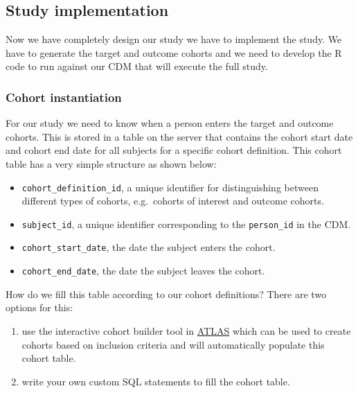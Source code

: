\documentclass[
]{article}
\providecommand{\tightlist}{%
  \setlength{\itemsep}{0pt}\setlength{\parskip}{0pt}}
\begin{document}
\hypertarget{study-implementation}{%
\subsection{Study implementation}\label{study-implementation}}

Now we have completely design our study we have to implement the study.
We have to generate the target and outcome cohorts and we need to
develop the R code to run against our CDM that will execute the full
study.

\hypertarget{cohort-instantiation}{%
\subsubsection{Cohort instantiation}\label{cohort-instantiation}}

For our study we need to know when a person enters the target and
outcome cohorts. This is stored in a table on the server that contains
the cohort start date and cohort end date for all subjects for a
specific cohort definition. This cohort table has a very simple
structure as shown below:

\begin{itemize}
\tightlist
\item
  \texttt{cohort\_definition\_id}, a unique identifier for
  distinguishing between different types of cohorts, e.g.~cohorts of
  interest and outcome cohorts.
\item
  \texttt{subject\_id}, a unique identifier corresponding to the
  \texttt{person\_id} in the CDM.
\item
  \texttt{cohort\_start\_date}, the date the subject enters the cohort.
\item
  \texttt{cohort\_end\_date}, the date the subject leaves the cohort.
\end{itemize}

How do we fill this table according to our cohort definitions? There are
two options for this:

\begin{enumerate}
\def\labelenumi{\arabic{enumi})}
\item
  use the interactive cohort builder tool in
  \href{www.github.com/OHDSI/ATLAS}{ATLAS} which can be used to create
  cohorts based on inclusion criteria and will automatically populate
  this cohort table.
\item
  write your own custom SQL statements to fill the cohort table.
\end{enumerate}
\end{document}
